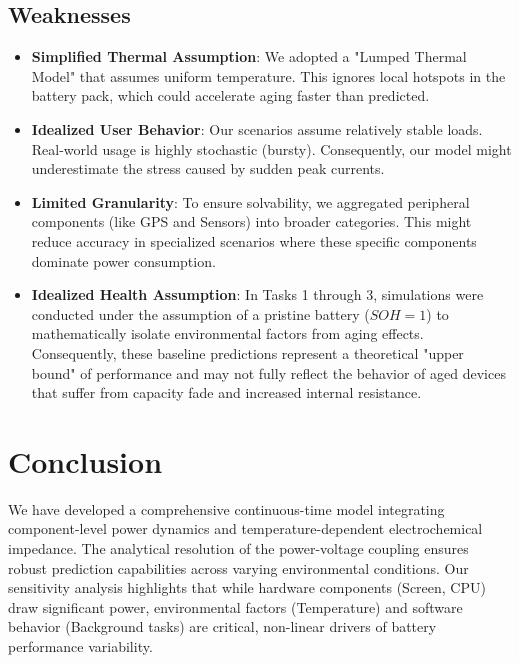 \documentclass{mcmthesis}
\begin{document}
\subsection{Weaknesses}
\begin{itemize}
    \item \textbf{Simplified Thermal Assumption}: We adopted a "Lumped Thermal Model" that assumes uniform temperature. This ignores local hotspots in the battery pack, which could accelerate aging faster than predicted.
    \item \textbf{Idealized User Behavior}: Our scenarios assume relatively stable loads. Real-world usage is highly stochastic (bursty). Consequently, our model might underestimate the stress caused by sudden peak currents.
    \item \textbf{Limited Granularity}: To ensure solvability, we aggregated peripheral components (like GPS and Sensors) into broader categories. This might reduce accuracy in specialized scenarios where these specific components dominate power consumption.
    \item \textbf{Idealized Health Assumption}: In Tasks 1 through 3, simulations were conducted under the assumption of a pristine battery ($SOH=1$) to mathematically isolate environmental factors from aging effects. Consequently, these baseline predictions represent a theoretical "upper bound" of performance and may not fully reflect the behavior of aged devices that suffer from capacity fade and increased internal resistance.
\end{itemize}

\section{Conclusion}
We have developed a comprehensive continuous-time model integrating component-level power dynamics and temperature-dependent electrochemical impedance. The analytical resolution of the power-voltage coupling ensures robust prediction capabilities across varying environmental conditions. Our sensitivity analysis highlights that while hardware components (Screen, CPU) draw significant power, environmental factors (Temperature) and software behavior (Background tasks) are critical, non-linear drivers of battery performance variability.
\end{document}
